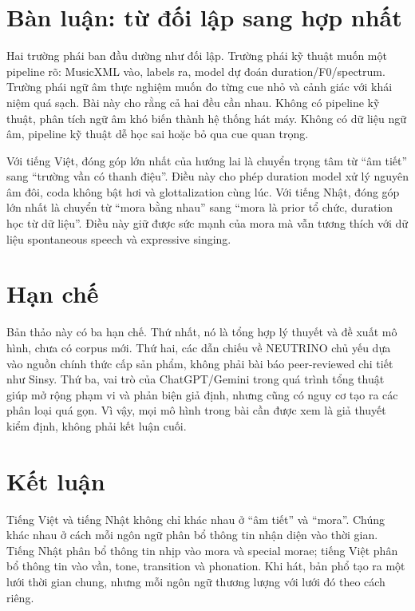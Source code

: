 \documentclass[12pt,a4paper]{article}
\begin{document}
\section{Bàn luận: từ đối lập sang hợp nhất}

Hai trường phái ban đầu dường như đối lập. Trường phái kỹ thuật muốn một pipeline rõ: MusicXML vào, labels ra, model dự đoán duration/F0/spectrum. Trường phái ngữ âm thực nghiệm muốn đo từng cue nhỏ và cảnh giác với khái niệm quá sạch. Bài này cho rằng cả hai đều cần nhau. Không có pipeline kỹ thuật, phân tích ngữ âm khó biến thành hệ thống hát máy. Không có dữ liệu ngữ âm, pipeline kỹ thuật dễ học sai hoặc bỏ qua cue quan trọng.

Với tiếng Việt, đóng góp lớn nhất của hướng lai là chuyển trọng tâm từ 
\enquote{âm tiết} sang 
\enquote{trường vần có thanh điệu}. Điều này cho phép duration model xử lý nguyên âm đôi, coda không bật hơi và glottalization cùng lúc. Với tiếng Nhật, đóng góp lớn nhất là chuyển từ 
\enquote{mora bằng nhau} sang 
\enquote{mora là prior tổ chức, duration học từ dữ liệu}. Điều này giữ được sức mạnh của mora mà vẫn tương thích với dữ liệu spontaneous speech và expressive singing.

\section{Hạn chế}

Bản thảo này có ba hạn chế. Thứ nhất, nó là tổng hợp lý thuyết và đề xuất mô hình, chưa có corpus mới. Thứ hai, các dẫn chiếu về NEUTRINO chủ yếu dựa vào nguồn chính thức cấp sản phẩm, không phải bài báo peer-reviewed chi tiết như Sinsy. Thứ ba, vai trò của ChatGPT/Gemini trong quá trình tổng thuật giúp mở rộng phạm vi và phản biện giả định, nhưng cũng có nguy cơ tạo ra các phân loại quá gọn. Vì vậy, mọi mô hình trong bài cần được xem là giả thuyết kiểm định, không phải kết luận cuối.

\section{Kết luận}

Tiếng Việt và tiếng Nhật không chỉ khác nhau ở 
\enquote{âm tiết} và 
\enquote{mora}. Chúng khác nhau ở cách mỗi ngôn ngữ phân bổ thông tin nhận diện vào thời gian. Tiếng Nhật phân bổ thông tin nhịp vào mora và special morae; tiếng Việt phân bổ thông tin vào vần, tone, transition và phonation. Khi hát, bản phổ tạo ra một lưới thời gian chung, nhưng mỗi ngôn ngữ thương lượng với lưới đó theo cách riêng.
\end{document}
